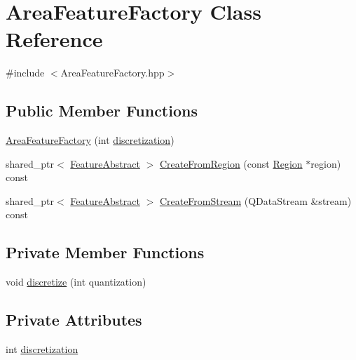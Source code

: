 \hypertarget{class_area_feature_factory}{\section{Area\+Feature\+Factory Class Reference}
\label{class_area_feature_factory}
}


{\ttfamily \#include $<$Area\+Feature\+Factory.\+hpp$>$}

\subsection*{Public Member Functions}
\begin{DoxyCompactItemize}
\item 
\hyperlink{class_area_feature_factory_a1299cd28490bc46f5ee66e16b712e37d}{Area\+Feature\+Factory} (int \hyperlink{class_area_feature_factory_a77f36879829aeb6c25e7da509649b1ef}{discretization})
\item 
shared\+\_\+ptr$<$ \hyperlink{class_feature_abstract}{Feature\+Abstract} $>$ \hyperlink{class_area_feature_factory_aebaa392a4f7bba61c02edda7f932ee9c}{Create\+From\+Region} (const \hyperlink{class_region}{Region} $\ast$region) const 
\item 
shared\+\_\+ptr$<$ \hyperlink{class_feature_abstract}{Feature\+Abstract} $>$ \hyperlink{class_area_feature_factory_ad2145ad17552e13fa4879dfed65816d1}{Create\+From\+Stream} (Q\+Data\+Stream \&stream) const 
\end{DoxyCompactItemize}
\subsection*{Private Member Functions}
\begin{DoxyCompactItemize}
\item 
void \hyperlink{class_area_feature_factory_a9e08ded8fb8dcf407edd0d7ec328129b}{discretize} (int quantization)
\end{DoxyCompactItemize}
\subsection*{Private Attributes}
\begin{DoxyCompactItemize}
\item 
int \hyperlink{class_area_feature_factory_a77f36879829aeb6c25e7da509649b1ef}{discretization}
\end{DoxyCompactItemize}


